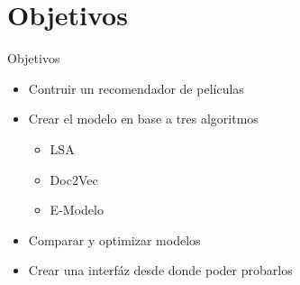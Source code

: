 \documentclass{beamer}
\begin{document}
  \section{Objetivos}
  \begin{frame}{Objetivos}
      \begin{itemize}
          \item Contruir un recomendador de películas
          \item Crear el modelo en base a tres algoritmos
              \begin{itemize}
                  \item LSA
                  \item Doc2Vec
                  \item E-Modelo
              \end{itemize}
          \item Comparar y optimizar modelos
          \item Crear una interfáz desde donde poder probarlos
      \end{itemize}
  \end{frame}
\end{document}
